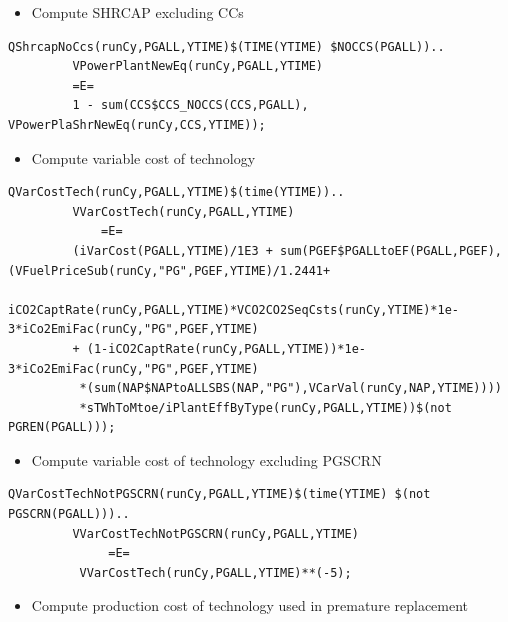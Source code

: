 \documentclass[a4paper,]{scrartcl}
\providecommand{\tightlist}{%
  \setlength{\itemsep}{0pt}\setlength{\parskip}{0pt}}
\begin{document}
\begin{itemize}
\tightlist
\item
  Compute SHRCAP excluding CCs
\end{itemize}

\begin{lstlisting}
QShrcapNoCcs(runCy,PGALL,YTIME)$(TIME(YTIME) $NOCCS(PGALL))..
         VPowerPlantNewEq(runCy,PGALL,YTIME) 
         =E= 
         1 - sum(CCS$CCS_NOCCS(CCS,PGALL), VPowerPlaShrNewEq(runCy,CCS,YTIME));
\end{lstlisting}

\begin{itemize}
\tightlist
\item
  Compute variable cost of technology
\end{itemize}

\begin{lstlisting}
QVarCostTech(runCy,PGALL,YTIME)$(time(YTIME))..
         VVarCostTech(runCy,PGALL,YTIME) 
             =E=
         (iVarCost(PGALL,YTIME)/1E3 + sum(PGEF$PGALLtoEF(PGALL,PGEF), (VFuelPriceSub(runCy,"PG",PGEF,YTIME)/1.2441+
         iCO2CaptRate(runCy,PGALL,YTIME)*VCO2CO2SeqCsts(runCy,YTIME)*1e-3*iCo2EmiFac(runCy,"PG",PGEF,YTIME)
         + (1-iCO2CaptRate(runCy,PGALL,YTIME))*1e-3*iCo2EmiFac(runCy,"PG",PGEF,YTIME)
          *(sum(NAP$NAPtoALLSBS(NAP,"PG"),VCarVal(runCy,NAP,YTIME))))
          *sTWhToMtoe/iPlantEffByType(runCy,PGALL,YTIME))$(not PGREN(PGALL)));
\end{lstlisting}

\begin{itemize}
\tightlist
\item
  Compute variable cost of technology excluding PGSCRN
\end{itemize}

\begin{lstlisting}
QVarCostTechNotPGSCRN(runCy,PGALL,YTIME)$(time(YTIME) $(not PGSCRN(PGALL)))..
         VVarCostTechNotPGSCRN(runCy,PGALL,YTIME) 
              =E=
          VVarCostTech(runCy,PGALL,YTIME)**(-5);
\end{lstlisting}

\begin{itemize}
\tightlist
\item
  Compute production cost of technology used in premature replacement
\end{itemize}
\end{document}

